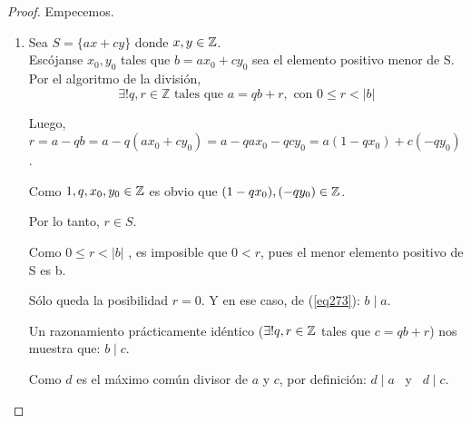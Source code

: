 \begin{proof} Empecemos. 
\begin{enumerate}[label=\roman*)]
\item Sea $S = \{ax + cy\}$ donde $x,y \in \mathbb{Z}$. \\
Escójanse $x_0,y_0$ tales que $b = ax_0 + cy_0$ sea el elemento positivo menor de S. \\
Por el algoritmo de la división,
\begin{equation} \label{eq273}
    \exists! q, r \in \mathbb{Z} \text{ tales que } a = qb + r, \text{ con } 0 \leq r < |b|
\end{equation}

Luego, $r = a-qb = a - q(ax_0 + cy_0) = a - qax_0 - qcy_0 = a(1 - qx_0) + c(-qy_0)$. 

Como $1,q,x_0,y_0 \in \mathbb{Z}$ es obvio que $(1 - qx_0), (-qy_0) \in \mathbb{Z}$. 

Por lo tanto, $r \in S$. 

Como $0 \leq r < |b|$ , es imposible que $0 < r$, pues el menor elemento positivo de S es b. 

Sólo queda la posibilidad $r = 0$. Y en ese caso, de (\ref{eq273}): $b \mid a$. 

Un razonamiento prácticamente idéntico 
($\exists! q,r \in \mathbb{Z}$ tales que $c = qb + r$) nos muestra que: $b \mid c$. 

Como $d$ es el máximo común divisor de $a$ y $c$, por definición: $d \mid a$ \, y \, $d \mid c$. 


\end{enumerate}
\end{proof}

